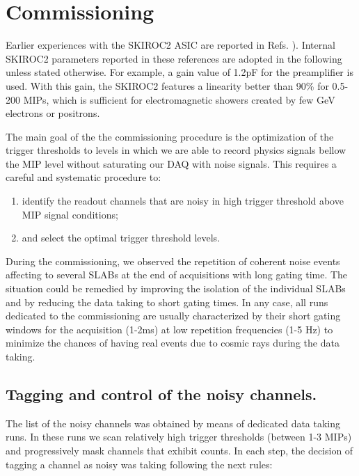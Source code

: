 \documentclass[a4paper,11pt]{article}
\begin{document}
\section{Commissioning}
\label{sec:commissioning}

Earlier experiences with the SKIROC2 ASIC are reported in
Refs. \cite{Amjad:2014tha,Suehara:2018mqk}). 
Internal SKIROC2 parameters reported in these references are adopted in the following
unless stated otherwise.
For example, a gain value of 1.2pF for the preamplifier is used. 
With this gain, the SKIROC2 features a linearity better than 90\% 
for 0.5-200 MIPs, which is sufficient for 
electromagnetic showers created by few GeV 
electrons or positrons.

The main goal of the the commissioning  procedure is 
the optimization of the trigger thresholds to levels in which we are able
to record physics signals bellow the MIP level without saturating our DAQ with
noise signals. This requires a careful and systematic procedure to:

\begin{enumerate}
  \item identify the readout channels that are noisy in high trigger threshold above MIP signal conditions;
  \item and select the optimal trigger threshold levels.
\end{enumerate}

During the commissioning, we observed the repetition of coherent noise events affecting to several
SLABs at the end of acquisitions with long gating time. The situation
could be remedied by improving the isolation of the individual SLABs and by reducing the
data taking to short gating times.
In any case, all runs dedicated to the commissioning are usually characterized by their short gating windows for the acquisition (1-2ms)
at low repetition frequencies (1-5 Hz)
to minimize the chances of having real events due to cosmic
rays during the data taking.


\subsection{Tagging and control of the noisy channels.}
\label{sec:comm_noise}

The list of the noisy channels was
obtained by means of dedicated data taking runs. In these runs
we scan relatively high trigger thresholds (between 1-3 MIPs) and progressively mask channels that exhibit counts. 
In each step, the decision of tagging a channel as noisy was taking following the next rules:
\end{document}

